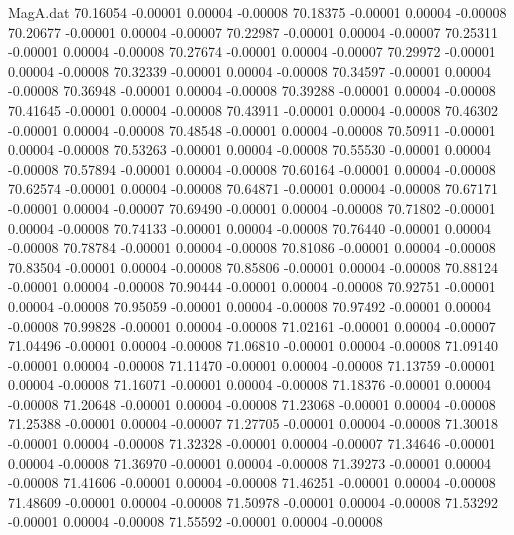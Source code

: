 \begin{filecontents}{MagA.dat}
  70.16054   -0.00001    0.00004   -0.00008
  70.18375   -0.00001    0.00004   -0.00008
  70.20677   -0.00001    0.00004   -0.00007
  70.22987   -0.00001    0.00004   -0.00007
  70.25311   -0.00001    0.00004   -0.00008
  70.27674   -0.00001    0.00004   -0.00007
  70.29972   -0.00001    0.00004   -0.00008
  70.32339   -0.00001    0.00004   -0.00008
  70.34597   -0.00001    0.00004   -0.00008
  70.36948   -0.00001    0.00004   -0.00008
  70.39288   -0.00001    0.00004   -0.00008
  70.41645   -0.00001    0.00004   -0.00008
  70.43911   -0.00001    0.00004   -0.00008
  70.46302   -0.00001    0.00004   -0.00008
  70.48548   -0.00001    0.00004   -0.00008
  70.50911   -0.00001    0.00004   -0.00008
  70.53263   -0.00001    0.00004   -0.00008
  70.55530   -0.00001    0.00004   -0.00008
  70.57894   -0.00001    0.00004   -0.00008
  70.60164   -0.00001    0.00004   -0.00008
  70.62574   -0.00001    0.00004   -0.00008
  70.64871   -0.00001    0.00004   -0.00008
  70.67171   -0.00001    0.00004   -0.00007
  70.69490   -0.00001    0.00004   -0.00008
  70.71802   -0.00001    0.00004   -0.00008
  70.74133   -0.00001    0.00004   -0.00008
  70.76440   -0.00001    0.00004   -0.00008
  70.78784   -0.00001    0.00004   -0.00008
  70.81086   -0.00001    0.00004   -0.00008
  70.83504   -0.00001    0.00004   -0.00008
  70.85806   -0.00001    0.00004   -0.00008
  70.88124   -0.00001    0.00004   -0.00008
  70.90444   -0.00001    0.00004   -0.00008
  70.92751   -0.00001    0.00004   -0.00008
  70.95059   -0.00001    0.00004   -0.00008
  70.97492   -0.00001    0.00004   -0.00008
  70.99828   -0.00001    0.00004   -0.00008
  71.02161   -0.00001    0.00004   -0.00007
  71.04496   -0.00001    0.00004   -0.00008
  71.06810   -0.00001    0.00004   -0.00008
  71.09140   -0.00001    0.00004   -0.00008
  71.11470   -0.00001    0.00004   -0.00008
  71.13759   -0.00001    0.00004   -0.00008
  71.16071   -0.00001    0.00004   -0.00008
  71.18376   -0.00001    0.00004   -0.00008
  71.20648   -0.00001    0.00004   -0.00008
  71.23068   -0.00001    0.00004   -0.00008
  71.25388   -0.00001    0.00004   -0.00007
  71.27705   -0.00001    0.00004   -0.00008
  71.30018   -0.00001    0.00004   -0.00008
  71.32328   -0.00001    0.00004   -0.00007
  71.34646   -0.00001    0.00004   -0.00008
  71.36970   -0.00001    0.00004   -0.00008
  71.39273   -0.00001    0.00004   -0.00008
  71.41606   -0.00001    0.00004   -0.00008
  71.46251   -0.00001    0.00004   -0.00008
  71.48609   -0.00001    0.00004   -0.00008
  71.50978   -0.00001    0.00004   -0.00008
  71.53292   -0.00001    0.00004   -0.00008
  71.55592   -0.00001    0.00004   -0.00008

\end{filecontents}
